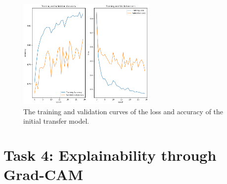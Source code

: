 \documentclass[conference]{IEEEtran}
\begin{document}
\begin{figure}[h] \centering \includegraphics[width=0.6\textwidth]{fig_task3_training_curves_train_validation_initial_model.png} 
	\caption{The training and validation curves of the loss and accuracy of the initial transfer model.} \label{fig:task3_curves_initial} 
\end{figure}

\section{Task 4: Explainability through Grad-CAM}\label{sec:task_4}
\end{document}

